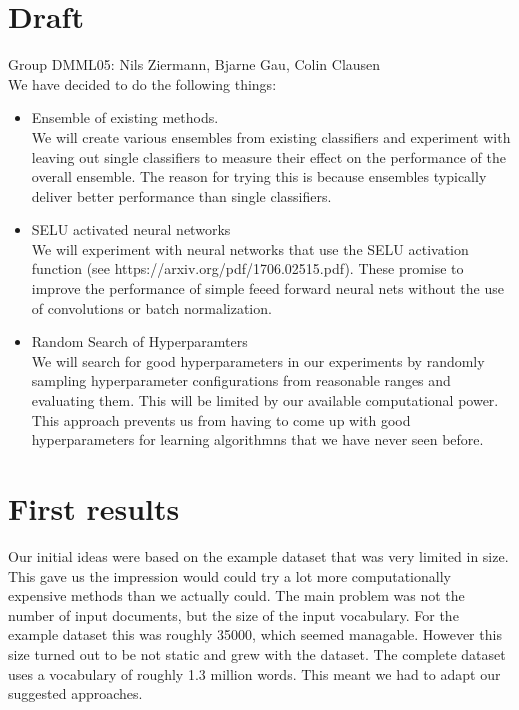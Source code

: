 \documentclass{article}
\begin{document}
\section*{Draft}
Group DMML05: Nils Ziermann, Bjarne Gau, Colin Clausen
\\
We have decided to do the following things:
\\

\begin{itemize}
\item Ensemble of existing methods.
\\
We will create various ensembles from existing classifiers and experiment with leaving out 
single classifiers to measure their effect on the performance of the overall ensemble.
The reason for trying this is because ensembles typically deliver better performance than single classifiers.

\item SELU activated neural networks
\\
We will experiment with neural networks that use the SELU activation function (see https://arxiv.org/pdf/1706.02515.pdf). These promise to improve the performance of simple feeed forward neural nets without the use of convolutions or batch normalization.

\item Random Search of Hyperparamters
\\
We will search for good hyperparameters in our experiments by randomly sampling hyperparameter configurations from reasonable ranges and evaluating them. This will be limited by our available computational power. This approach prevents us from having to come up with good hyperparameters for learning algorithmns that we have never seen before.

\end{itemize}

\section*{First results}

Our initial ideas were based on the example dataset that was very limited in size. This gave us the impression would could try a lot more computationally expensive methods than we actually could.
The main problem was not the number of input documents, but the size of the input vocabulary. For the example dataset this was roughly 35000, which seemed managable. However this size turned out to be not static and grew
with the dataset. The complete dataset uses a vocabulary of roughly 1.3 million words. This meant we had to adapt our suggested approaches.
\end{document}
